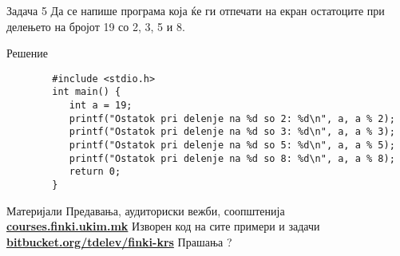 \begin{frame}[fragile]{Задача 5}
Да се напише програма која ќе ги отпечати на екран остатоците при делењето на бројот 19 со 2, 3, 5 и 8.
	\begin{exampleblock}{Решение}
		\begin{lstlisting}
		#include <stdio.h>
		int main() {
		   int a = 19;
		   printf("Ostatok pri delenje na %d so 2: %d\n", a, a % 2);
		   printf("Ostatok pri delenje na %d so 3: %d\n", a, a % 3);
		   printf("Ostatok pri delenje na %d so 5: %d\n", a, a % 5);
		   printf("Ostatok pri delenje na %d so 8: %d\n", a, a % 8);
		   return 0;
		}
		\end{lstlisting}
	\end{exampleblock}
\end{frame}

\begin{frame}{Материјали}{}
	Предавања, аудиториски вежби, соопштенија\\
	\href{http://courses.finki.ukim.mk/}{\textbf{courses.finki.ukim.mk}}
	\vfill
	Изворен код на сите примери и задачи\\
	\href{http://bitbucket.org/tdelev/finki-krs/}{\textbf{bitbucket.org/tdelev/finki-krs}}
	\vfill
	{\Huge Прашања ?}
\end{frame}

